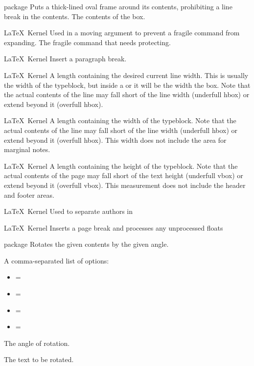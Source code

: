 %
 {}%
 { package}%
 {Puts a thick-lined oval frame around its contents, prohibiting a line break in the
  contents.}%
 {%
   \BeginArgList
      The contents of the box.
   \EndArgList
 }

%
 {}%
 {\LaTeX\ Kernel}%
 {Used in a moving argument to prevent a fragile command from expanding.}%
 {%
   \BeginArgList
     The fragile command that needs protecting.
   \EndArgList
 }

%
 {}%
 {\LaTeX\ Kernel}%
 {Insert a paragraph break.}%
 {}

%
 {}%
 {\LaTeX\ Kernel}%
 {A length containing the desired current line width. This is
  usually the width of the typeblock, but inside a 
  or  it will be the width the box. Note that
  the actual contents of the line may fall short of the line width
  (underfull hbox) or extend beyond it (overfull hbox).}%
 {}

%
 {}%
 {\LaTeX\ Kernel}%
 {A length containing the width of the typeblock. Note that
  the actual contents of the line may fall short of the line width
  (underfull hbox) or extend beyond it (overfull hbox). This width
  does not include the area for marginal notes.}%
 {}

%
 {}%
 {\LaTeX\ Kernel}%
 {A length containing the height of the typeblock. Note that
  the actual contents of the page may fall short of the text height
  (underfull vbox) or extend beyond it (overfull vbox). This
  measurement does not include the header and footer areas.}%
 {}

%
 {}%
 {\LaTeX\ Kernel}%
 {Used to separate authors in }%
 {}

%
 {}%
 {\LaTeX\ Kernel}%
 {Inserts a page break and processes any unprocessed floats}%
 {}

%
 {}%
 { package}%
 {Rotates the given contents by the given angle.}%
 {%
   \BeginArgList
      A comma-separated list of options:
      \protect\begin{itemize}
       \protect\item {}=
       \protect\item {}=
       \protect\item {}=
       \protect\item {}=
      \protect\end{itemize}

      The angle of rotation.

      The text to be rotated.
   \EndArgList
 }

